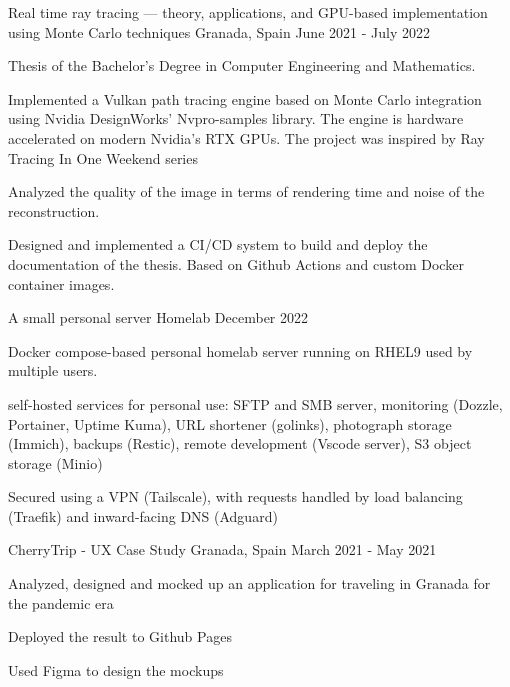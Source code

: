 
\begin{cventries}
    \cventry
      {}
      {Real time ray tracing — theory, applications, and GPU-based implementation using Monte Carlo techniques}
      {Granada, Spain}
      {June 2021 - July 2022}
      {
        \begin{cvitems} %
          \item {Thesis of the Bachelor's Degree in Computer Engineering and Mathematics.}
          \item {Implemented a Vulkan path tracing engine based on Monte Carlo integration using Nvidia DesignWorks' Nvpro-samples library. The engine is hardware accelerated on modern Nvidia's RTX GPUs. The project was inspired by Ray Tracing In One Weekend series}
          \item {Analyzed the quality of the image in terms of rendering time and noise of the reconstruction.}
          \item {Designed and implemented a CI/CD system to build and deploy the documentation of the thesis. Based on Github Actions and custom Docker container images.}
        \end{cvitems}
      }

    \cventry
        {A small personal server}
        {Homelab}
        {}
        {December 2022}
        {
          \begin{cvitems} %
            \item {Docker compose-based personal homelab server running on RHEL9 used by multiple users.}
            \item {self-hosted services for personal use: SFTP and SMB server, monitoring (Dozzle, Portainer, Uptime Kuma), URL shortener (golinks), photograph storage (Immich), backups (Restic), remote development (Vscode server), S3 object storage (Minio) }
            \item {Secured using a VPN (Tailscale), with requests handled by load balancing (Traefik) and inward-facing DNS (Adguard) }
          \end{cvitems}
        }

    \cventry
      {}
      {CherryTrip - UX Case Study}
      {Granada, Spain}
      {March 2021 - May 2021}
      {
        \begin{cvitems} %
          \item {Analyzed, designed and mocked up an application for traveling in Granada for the pandemic era }
          \item {Deployed the result to Github Pages}
          \item {Used Figma to design the mockups}
        \end{cvitems}
      }


\end{cventries}
